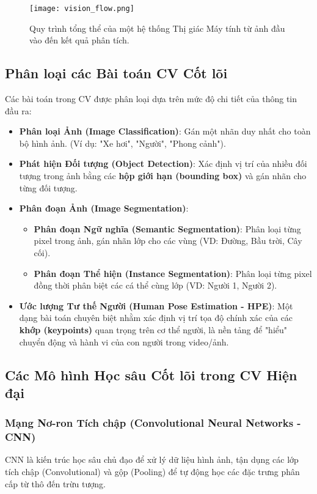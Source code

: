 \begin{figure}[h]
    \centering
    \texttt{[image: vision\_flow.png]}
    \caption{Quy trình tổng thể của một hệ thống Thị giác Máy tính từ ảnh đầu vào đến kết quả phân tích.}
    \label{fig:cv_pipeline}
\end{figure}

\subsection{Phân loại các Bài toán CV Cốt lõi}
Các bài toán trong CV được phân loại dựa trên mức độ chi tiết của thông tin đầu ra:

\begin{itemize}
    \item \textbf{Phân loại Ảnh (Image Classification)}: Gán một nhãn duy nhất cho toàn bộ hình ảnh. (Ví dụ: "Xe hơi", "Người", "Phong cảnh").
    \item \textbf{Phát hiện Đối tượng (Object Detection)}: Xác định vị trí của nhiều đối tượng trong ảnh bằng các \textbf{hộp giới hạn (bounding box)} và gán nhãn cho từng đối tượng.
    \item \textbf{Phân đoạn Ảnh (Image Segmentation)}:
    \begin{itemize}
        \item \textbf{Phân đoạn Ngữ nghĩa (Semantic Segmentation)}: Phân loại từng pixel trong ảnh, gán nhãn lớp cho các vùng (VD: Đường, Bầu trời, Cây cối).
        \item \textbf{Phân đoạn Thể hiện (Instance Segmentation)}: Phân loại từng pixel đồng thời phân biệt các cá thể cùng lớp (VD: Người 1, Người 2).
    \end{itemize}
    \item \textbf{Ước lượng Tư thế Người (Human Pose Estimation - HPE)}: Một dạng bài toán chuyên biệt nhằm xác định vị trí tọa độ chính xác của các \textbf{khớp (keypoints)} quan trọng trên cơ thể người, là nền tảng để "hiểu" chuyển động và hành vi của con người trong video/ảnh.
\end{itemize}

\subsection{Các Mô hình Học sâu Cốt lõi trong CV Hiện đại}
\subsubsection{Mạng Nơ-ron Tích chập (Convolutional Neural Networks - CNN)}
CNN là kiến trúc học sâu chủ đạo để xử lý dữ liệu hình ảnh, tận dụng các lớp tích chập (Convolutional) và gộp (Pooling) để tự động học các đặc trưng phân cấp từ thô đến trừu tượng.

